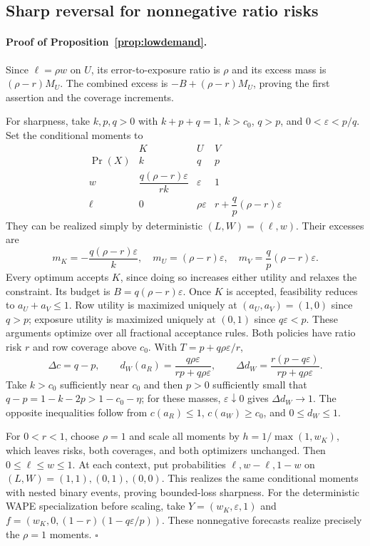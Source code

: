 \subsection{Sharp reversal for nonnegative ratio risks}
\paragraph{Proof of Proposition~\ref{prop:lowdemand}.}
Since $\ell=\rho w$ on $U$, its error-to-exposure ratio is $\rho$
and its excess mass is $(\rho-r)M_U$. The combined excess is
$-B+(\rho-r)M_U$, proving the first assertion and the coverage increments.

For sharpness, take $k,p,q>0$ with $k+p+q=1$, $k>c_0$, $q>p$,
and $0<\varepsilon<p/q$. Set the conditional moments to
\[
\begin{array}{c|ccc}
 &K&U&V\\\hline
 \Pr(X)&k&q&p\\
 w&\dfrac{q(\rho-r)\varepsilon}{rk}&\varepsilon&1\\
 \ell&0&\rho\varepsilon&r+\dfrac qp(\rho-r)\varepsilon
\end{array}
\]
They can be realized simply by deterministic $(L,W)=(\ell,w)$.
Their excesses are
\[
 m_K=-\frac{q(\rho-r)\varepsilon}{k},\quad
 m_U=(\rho-r)\varepsilon,\quad
 m_V=\frac qp(\rho-r)\varepsilon.
\]
Every optimum accepts $K$, since doing so increases either utility
and relaxes the constraint. Its budget is $B=q(\rho-r)\varepsilon$.
Once $K$ is accepted, feasibility reduces to $a_U+a_V\leq1$.
Row utility is maximized uniquely at $(a_U,a_V)=(1,0)$ since $q>p$;
exposure utility is maximized uniquely at $(0,1)$ since $q\varepsilon<p$.
These arguments optimize over all fractional acceptance rules.
Both policies have ratio risk $r$ and row coverage above $c_0$.
With $T=p+q\rho\varepsilon/r$,
\[
 \Delta c=q-p,\qquad
 d_W(a_R)=\frac{q\rho\varepsilon}{rp+q\rho\varepsilon},\qquad
 \Delta d_W=\frac{r(p-q\varepsilon)}{rp+q\rho\varepsilon}.
\]
Take $k>c_0$ sufficiently near $c_0$ and then $p>0$ sufficiently
small that $q-p=1-k-2p>1-c_0-\eta$; for these masses,
$\varepsilon\downarrow0$ gives $\Delta d_W\to1$.
The opposite inequalities follow from $c(a_R)\leq1$,
$c(a_W)\geq c_0$, and $0\leq d_W\leq1$.

For $0<r<1$, choose $\rho=1$ and scale all moments by
$h=1/\max(1,w_K)$, which leaves risks, both coverages, and both
optimizers unchanged. Then $0\leq\ell\leq w\leq1$.
At each context, put probabilities $\ell,w-\ell,1-w$ on
$(L,W)=(1,1),(0,1),(0,0)$. This realizes the same conditional moments
with nested binary events, proving bounded-loss sharpness.
For the deterministic WAPE specialization before scaling, take
$Y=(w_K,\varepsilon,1)$ and
$f=(w_K,0,(1-r)(1-q\varepsilon/p))$. These nonnegative forecasts
realize precisely the $\rho=1$ moments. \hfill$\square$

